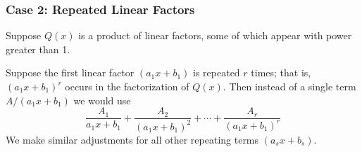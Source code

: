 \begin{frame}\frametitle{Case 2: Repeated Linear Factors}
Suppose $Q(x)$ is a product of linear factors, some of which appear with power greater than 1.

Suppose the first linear factor $(a_1x+b_1)$ is repeated $r$ times; that is, $(a_1x+b_1)^r$ occurs in the factorization of $Q(x)$.  Then instead of a single term $A/(a_1x+b_1)$ we would use
\[
\frac{A_1}{a_1x+b_1}%
 + \frac{A_2}{(a_1x+b_1)^2}%
 + \cdots %
 + \frac{A_r}{(a_1x+b_1)^r}%
\]
We make similar adjustments for all other repeating terms $(a_sx+b_s)$.
\end{frame}
